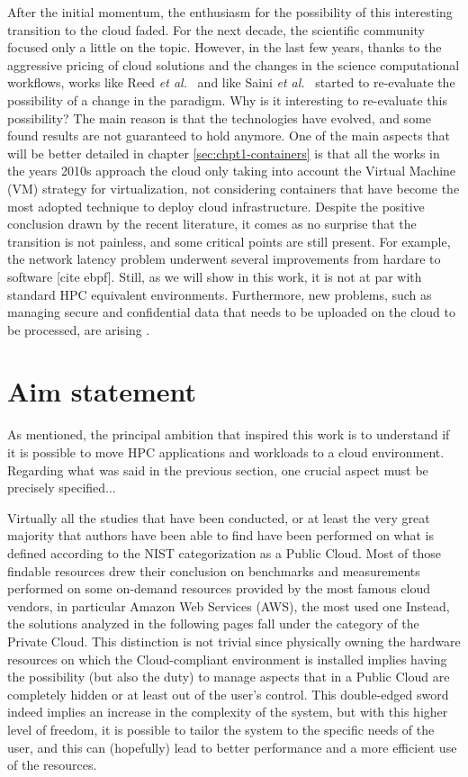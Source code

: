 After the initial momentum, the enthusiasm for the possibility of this
interesting transition to the cloud faded. For the next decade, the scientific
community focused only a little on the topic. However, in the last few years,
thanks to the aggressive pricing of cloud solutions and the changes in the
science computational workflows, works like Reed \emph{et al.}~\cite{Reed2022}
and like Saini \emph{et al.}~\cite{Saini2021} started to re-evaluate the
possibility of a change in the paradigm. Why is it interesting to re-evaluate
this possibility? The main reason is that the technologies have evolved, and
some found results are not guaranteed to hold anymore\cite{Guidi_2021}. One of
the main aspects that will be better detailed in chapter
\ref{sec:chpt1-containers} is that all the works in the years 2010s approach the
cloud only taking into account the Virtual Machine (VM) strategy for
virtualization, not considering containers that have become the most adopted
technique to deploy cloud infrastructure. Despite the positive conclusion drawn
by the recent literature, it comes as no surprise that the transition is not
painless, and some critical points are still present. For example, the network
latency problem underwent several improvements from hardare\cite{Firestone_2018}
to software [cite ebpf]. Still, as we will show in this work, it is not at par
with standard HPC equivalent environments. Furthermore, new problems, such as
managing secure and confidential data that needs to be uploaded on the cloud to
be processed, are arising \cite{Keke2023}.

\section{Aim statement}

As mentioned, the principal ambition that inspired this work is to understand if
it is possible to move HPC applications and workloads to a cloud environment.
Regarding what was said in the previous section, one crucial aspect must
be precisely specified...

Virtually all the studies that have been conducted, or at least
the very great majority that authors have been able to find have been performed
on what is defined according to the NIST categorization as a Public Cloud.
Most of those findable resources drew their conclusion on benchmarks and
measurements performed on some on-demand resources provided by the most famous
cloud vendors, in particular Amazon Web Services (AWS), the most used one
Instead, the solutions analyzed in the following pages fall under the category
of the Private Cloud.
This distinction is not trivial since physically owning the hardware resources
on which the Cloud-compliant environment is installed implies having the
possibility (but also the duty) to manage aspects that in a Public Cloud are
completely hidden or at least out of the user's control.
This double-edged sword indeed implies an increase in the complexity of the
system, but with this higher level of freedom, it is possible to tailor the
system to the specific needs of the user, and this can (hopefully) lead to
better performance and a more efficient use of the resources.

